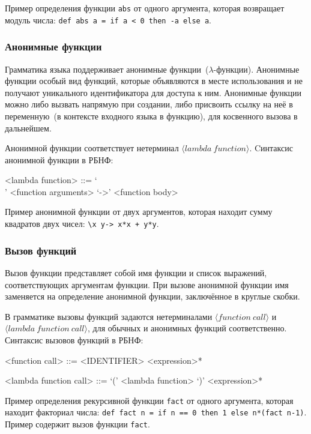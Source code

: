 \documentclass[12pt,a4paper,oneside]{extarticle}
\begin{document}
            Пример определения функции \lstinline$abs$ от одного аргумента, которая возвращает модуль числа: \lstinline$def abs a = if a < 0 then -a else a$.

        \subsubsection{Анонимные функции}
            Грамматика языка поддерживает анонимные функции~($\lambda$-функции). Анонимные функции особый вид функций, которые объявляются в месте использования и не получают уникального идентификатора для доступа к ним. Анонимные функции можно либо вызвать напрямую при создании, либо присвоить ссылку на неё в переменную~(в контексте входного языка в функцию), для косвенного вызова в дальнейшем.

            Анонимной функции соответствует нетерминал $\langle lambda~function \rangle$. Cинтаксис анонимной функции в РБНФ:
            \begin{grammar}
                <lambda function> ::= `\\' <function arguments> `->' <function body>
            \end{grammar}

            Пример анонимной функции от двух аргументов, которая находит сумму квадратов двух чисел: \lstinline$\x y-> x*x + y*y$.

        \subsubsection{Вызов функций}
            Вызов функции представляет собой имя функции и список выражений, соответствующих аргументам функции. При вызове анонимной функции имя заменяется на определение анонимной функции, заключённое в круглые скобки.

            В грамматике вызовы функций задаются нетерминалами $\langle function~call \rangle$ и $\langle lambda~function~call \rangle$, для обычных и анонимных функций соответственно. Синтаксис вызовов функций в РБНФ:

            \begin{grammar}
                <function call> ::= <IDENTIFIER> <expression>*

                <lambda function call> ::= `(' <lambda function> `)' <expression>*
            \end{grammar}

            Пример определения рекурсивной функции \lstinline$fact$ от одного аргумента, которая находит факториал числа: \lstinline$def fact n = if n == 0 then 1 else n*(fact n-1)$. Пример содержит вызов функции \lstinline$fact$.
\end{document}
